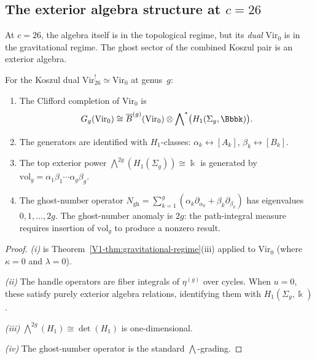 \subsection{The exterior algebra structure at $c = 26$}

At $c = 26$, the algebra itself is in the topological regime, but its
\emph{dual} $\mathrm{Vir}_0$ is in the gravitational regime. The ghost
sector of the combined Koszul pair is an exterior algebra.

\begin{theorem}[Ghost sector at $c = 26$; \ClaimStatusProvedHere]
For the Koszul dual $\mathrm{Vir}_{26}^! \simeq \mathrm{Vir}_0$
at genus~$g$:
\begin{enumerate}[label=\textup{(\roman*)}]
\item The Clifford completion of $\mathrm{Vir}_0$ is
\begin{equation}%
G_g(\mathrm{Vir}_0)
\cong \barB^{(g)}(\mathrm{Vir}_0) \otimes
\bigwedge\nolimits^*\bigl(H_1(\Sigma_g, \Bbbk)\bigr).
\end{equation}

\item The generators are identified with $H_1$-classes:
$\alpha_k \leftrightarrow [A_k]$, $\beta_k \leftrightarrow [B_k]$.

\item The top exterior power
$\bigwedge^{2g}(H_1(\Sigma_g)) \cong \Bbbk$ is generated by
$\mathrm{vol}_g = \alpha_1\beta_1 \cdots \alpha_g\beta_g$.

\item The ghost-number operator
$N_{\mathrm{gh}} = \sum_{k=1}^g(\alpha_k\partial_{\alpha_k} +
\beta_k\partial_{\beta_k})$ has eigenvalues $0, 1, \ldots, 2g$.
The ghost-number anomaly is $2g$: the path-integral measure requires
insertion of $\mathrm{vol}_g$ to produce a nonzero result.
\end{enumerate}
\end{theorem}

\begin{proof}
\emph{(i)} is Theorem~\ref{V1-thm:gravitational-regime}(iii) applied to
$\mathrm{Vir}_0$ (where $\kappa = 0$ and $\lambda = 0$).

\emph{(ii)} The handle operators are fiber integrals of $\eta^{(g)}$
over cycles. When $u = 0$, these satisfy purely exterior algebra
relations, identifying them with $H_1(\Sigma_g, \Bbbk)$.

\emph{(iii)} $\bigwedge^{2g}(H_1) \cong \det(H_1)$ is one-dimensional.

\emph{(iv)} The ghost-number operator is the standard
$\bigwedge$-grading.
\end{proof}

